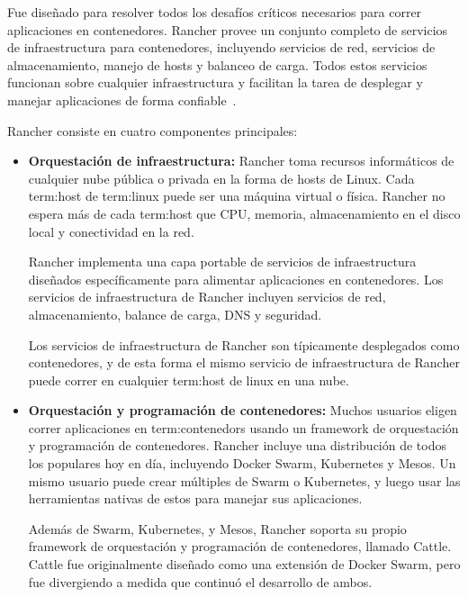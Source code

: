 Fue diseñado para resolver todos los desafíos críticos necesarios para correr
aplicaciones en contenedores. Rancher provee un conjunto completo de servicios
de infraestructura para contenedores, incluyendo servicios de red, servicios de
almacenamiento, manejo de hosts y balanceo de carga. Todos estos servicios
funcionan sobre cualquier infraestructura y facilitan la tarea de desplegar y
manejar aplicaciones de forma confiable~\cite{rancher}.

Rancher consiste en cuatro componentes principales:

\begin{itemize}

  \item \textbf{Orquestación de infraestructura:}
    Rancher toma recursos informáticos de cualquier nube pública o privada en
    la forma de hosts de Linux. Cada \gls{term:host} de \gls{term:linux} puede
    ser una máquina virtual o física. Rancher no espera más de cada
    \gls{term:host} que CPU, memoria, almacenamiento en el disco local y
    conectividad en la red.

    Rancher implementa una capa portable de servicios de infraestructura
    diseñados específicamente para alimentar aplicaciones en contenedores. Los
    servicios de infraestructura de Rancher incluyen servicios de red,
    almacenamiento, balance de carga, DNS y seguridad.

    Los servicios de infraestructura de Rancher son típicamente desplegados como
    contenedores, y de esta forma el mismo servicio de infraestructura de
    Rancher puede correr en cualquier \gls{term:host} de linux en una nube.

  \item \textbf{Orquestación y programación de contenedores:}
    Muchos usuarios eligen correr aplicaciones en \glspl{term:contenedor}
    usando un framework de orquestación y programación de contenedores. Rancher
    incluye una distribución de todos los  populares hoy en
    día, incluyendo Docker Swarm, Kubernetes y Mesos. Un mismo usuario puede
    crear múltiples  de Swarm o Kubernetes, y luego usar las
    herramientas nativas de estos  para manejar sus
    aplicaciones.

    Además de Swarm, Kubernetes, y Mesos, Rancher soporta su propio framework
    de orquestación y programación de contenedores, llamado Cattle. Cattle fue
    originalmente diseñado como una extensión de Docker Swarm, pero fue
    divergiendo a medida que continuó el desarrollo de ambos.


\end{itemize}
